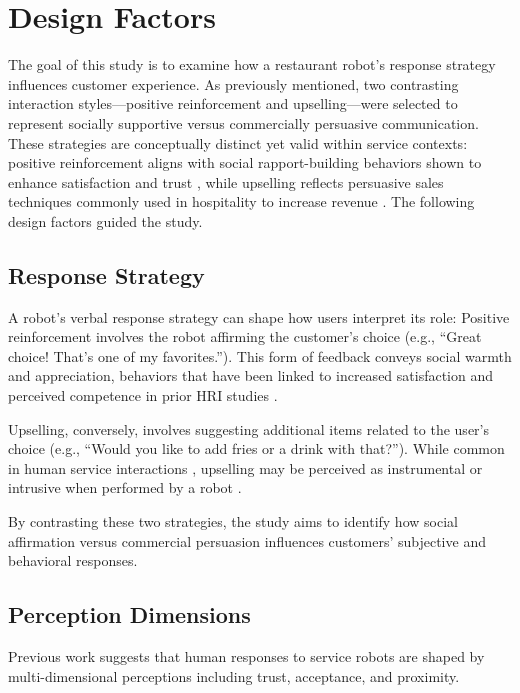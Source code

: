 \documentclass[conference]{IEEEtran}
\begin{document}
\section{Design Factors}
\label{sec:design_factors}
The goal of this study is to examine how a restaurant robot's response strategy influences customer experience. As previously mentioned, two contrasting interaction styles—positive reinforcement and upselling—were selected to represent socially supportive versus commercially persuasive communication. These strategies are conceptually distinct yet valid within service contexts: positive reinforcement aligns with social rapport-building behaviors shown to enhance satisfaction and trust \cite{b3, b11, b6}, while upselling reflects persuasive sales techniques commonly used in hospitality to increase revenue \cite{b12, b13}. The following design factors guided the study.

\subsection{Response Strategy}
A robot's verbal response strategy can shape how users interpret its role: Positive reinforcement involves the robot affirming the customer's choice (e.g., ``Great choice! That's one of my favorites.''). This form of feedback conveys social warmth and appreciation, behaviors that have been linked to increased satisfaction and perceived competence in prior HRI studies \cite{b14, b15}.

Upselling, conversely, involves suggesting additional items related to the user's choice (e.g., ``Would you like to add fries or a drink with that?''). While common in human service interactions \cite{b16}, upselling may be perceived as instrumental or intrusive when performed by a robot \cite{b17}.

By contrasting these two strategies, the study aims to identify how social affirmation versus commercial persuasion influences customers' subjective and behavioral responses.

\subsection{Perception Dimensions}
Previous work suggests that human responses to service robots are shaped by multi-dimensional perceptions including trust, acceptance, and proximity.
\end{document}
